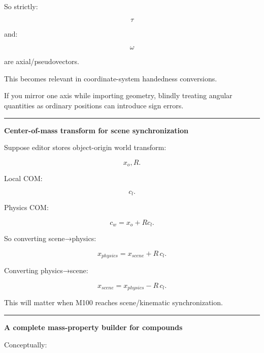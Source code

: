 So strictly:

\[
\tau
\]

and:

\[
\omega
\]

are axial/pseudovectors.

This becomes relevant in coordinate-system handedness conversions.

If you mirror one axis while importing geometry, blindly treating angular quantities as ordinary positions can introduce sign errors.

\begin{center}\rule{0.5\linewidth}{0.5pt}\end{center}

\textbf{Center-of-mass transform for scene synchronization}

Suppose editor stores object-origin world transform:

\[
x_o,R.
\]

Local COM:

\[
c_l.
\]

Physics COM:

\[
c_w
=
x_o+
Rc_l.
\]

So converting scene→physics:

\[
\boxed{
x_{physics}
=
x_{scene}
+
R\,c_l.
}
\]

Converting physics→scene:

\[
\boxed{
x_{scene}
=
x_{physics}
-
R\,c_l.
}
\]

This will matter when M100 reaches scene/kinematic synchronization.

\begin{center}\rule{0.5\linewidth}{0.5pt}\end{center}

\textbf{A complete mass-property builder for compounds}

Conceptually:

